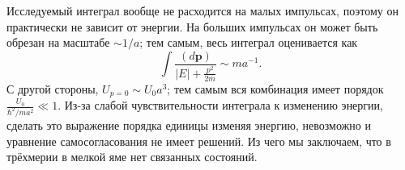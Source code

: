 \documentclass[a4paper]{article}
\begin{document}
\begin{sol}
\begin{enumerate}
Исследуемый интеграл вообще не расходится на малых импульсах,
поэтому он практически не зависит от энергии.
На больших импульсах он может быть обрезан на масштабе $\sim 1 /a$; тем самым, весь интеграл оценивается как
\[
	\int \frac{(d\mathbf{p})}{|E|+ \frac{p^2}{2m}}\sim 
	m a^{-1}
.\] 
С другой стороны, $U_{p=0}\sim U_0 a^3$; тем самым вся комбинация
имеет порядок $\frac{U_0}{\hbar^2 /ma^2}\ll 1$. Из-за
слабой чувствительности интеграла к изменению энергии, сделать
это выражение порядка единицы изменяя энергию, невозможно и
уравнение самосогласования не имеет решений. Из чего мы заключаем,
что в трёхмерии в мелкой яме нет связанных состояний.
\end{enumerate}

\end{sol}
\end{document}
